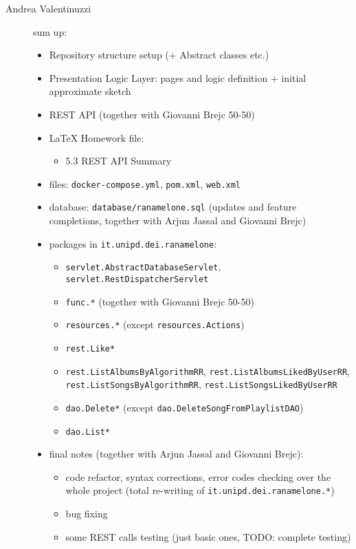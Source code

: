 \begin{description}
    \item[Andrea Valentinuzzi] sum up:
    \begin{itemize}
        \item Repository structure setup (+ Abstract classes etc.)
        \item Presentation Logic Layer: pages and logic definition + initial approximate sketch
        \item REST API (together with Giovanni Brejc 50-50)
        \item LaTeX Homework file:
        \begin{itemize}
            \item 5.3 REST API Summary
        \end{itemize}
        \item files: \verb|docker-compose.yml|, \verb|pom.xml|, \verb|web.xml|
        \item database: \verb|database/ranamelone.sql| (updates and feature completions, together with Arjun Jassal and Giovanni Brejc)
        \item packages in \verb|it.unipd.dei.ranamelone|:
        \begin{itemize}
            \item \verb|servlet.AbstractDatabaseServlet|, \verb|servlet.RestDispatcherServlet|
            \item \verb|func.*| (together with Giovanni Brejc 50-50)
            \item \verb|resources.*| (except \verb|resources.Actions|)
            \item \verb|rest.Like*|
            \item \verb|rest.ListAlbumsByAlgorithmRR|, \verb|rest.ListAlbumsLikedByUserRR|, \verb|rest.ListSongsByAlgorithmRR|, \verb|rest.ListSongsLikedByUserRR|
            \item \verb|dao.Delete*| (except \verb|dao.DeleteSongFromPlaylistDAO|)
            \item \verb|dao.List*| 
        \end{itemize}
        \item final notes (together with Arjun Jassal and Giovanni Brejc):
        \begin{itemize}
            \item code refactor, syntax corrections, error codes checking over the whole project (total re-writing of \verb|it.unipd.dei.ranamelone.*|)
            \item bug fixing
            \item some REST calls testing (just basic ones, TODO: complete testing)
        \end{itemize}
    \end{itemize}


\end{description}
